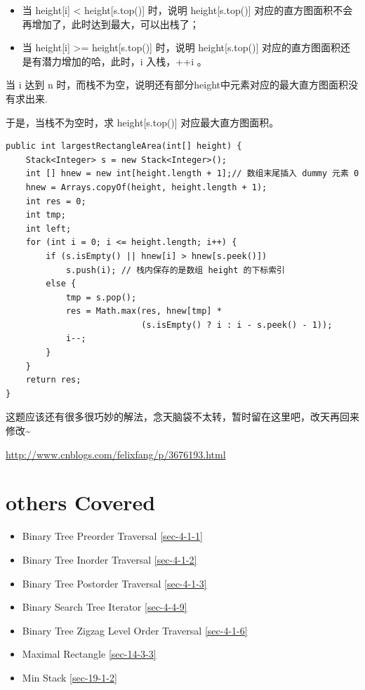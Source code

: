 \documentclass[12pt]{book}
\begin{document}
\begin{enumerate}
\begin{itemize}
\item 当 height[i] < height[s.top()] 时，说明 height[s.top()] 对应的直方图面积不会再增加了，此时达到最大，可以出栈了；

\item 当 height[i] >= height[s.top()] 时，说明 height[s.top()] 对应的直方图面积还是有潜力增加的哈，此时，i 入栈，++i 。
\end{itemize}

当 i 达到 n 时，而栈不为空，说明还有部分height中元素对应的最大直方图面积没有求出来.

于是，当栈不为空时，求 height[s.top()] 对应最大直方图面积。

\lstset{language=java,label= ,caption= ,numbers=none}
\begin{lstlisting}
public int largestRectangleArea(int[] height) {
    Stack<Integer> s = new Stack<Integer>();
    int [] hnew = new int[height.length + 1];// 数组末尾插入 dummy 元素 0
    hnew = Arrays.copyOf(height, height.length + 1);
    int res = 0; 
    int tmp;     
    int left;
    for (int i = 0; i <= height.length; i++) {
        if (s.isEmpty() || hnew[i] > hnew[s.peek()])
            s.push(i); // 栈内保存的是数组 height 的下标索引
        else {
            tmp = s.pop();
            res = Math.max(res, hnew[tmp] * 
                           (s.isEmpty() ? i : i - s.peek() - 1));
            i--;
        }
    }
    return res;
}
\end{lstlisting}

这题应该还有很多很巧妙的解法，念天脑袋不太转，暂时留在这里吧，改天再回来修改\textasciitilde{}~

\url{http://www.cnblogs.com/felixfang/p/3676193.html}
\end{enumerate}

\section{others Covered}
\label{sec-5-4}
\begin{itemize}
\item Binary Tree Preorder Traversal
\ref{sec-4-1-1}
\item Binary Tree Inorder Traversal
\ref{sec-4-1-2}
\item Binary Tree Postorder Traversal
\ref{sec-4-1-3}
\item Binary Search Tree Iterator        
\ref{sec-4-4-9}
\item Binary Tree Zigzag Level Order Traversal
\ref{sec-4-1-6}
\item Maximal Rectangle
\ref{sec-14-3-3}
\item Min Stack
\ref{sec-19-1-2}
\end{itemize}
\end{document}

